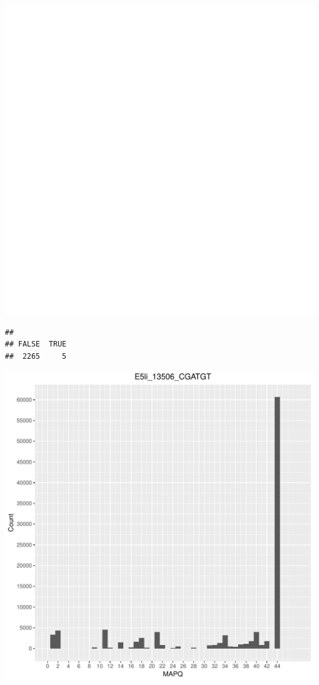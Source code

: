 \documentclass[12pt, a4paper]{article}\usepackage[]{graphicx}\usepackage[]{color}
\makeatletter
\def\maxwidth{ %
  \ifdim\Gin@nat@width>\linewidth
    \linewidth
  \else
    \Gin@nat@width
  \fi
}
\newenvironment{kframe}{%
 \def\at@end@of@kframe{}%
 \ifinner\ifhmode%
  \def\at@end@of@kframe{\end{minipage}}%
  \begin{minipage}{\columnwidth}%
 \fi\fi%
 \def\FrameCommand##1{\hskip\@totalleftmargin \hskip-\fboxsep
 \colorbox{shadecolor}{##1}\hskip-\fboxsep
     \hskip-\linewidth \hskip-\@totalleftmargin \hskip\columnwidth}%
 \MakeFramed {\advance\hsize-\width
   \@totalleftmargin\z@ \linewidth\hsize
   \@setminipage}}%
 {\par\unskip\endMakeFramed%
 \at@end@of@kframe}
\newenvironment{knitrout}{}{} %
\makeatother
\begin{document}
\begin{knitrout}
\includegraphics[width=\maxwidth]{figure/unnamed-chunk-3-18} 
\begin{kframe}\begin{verbatim}
## 
## FALSE  TRUE 
##  2265     5
\end{verbatim}
\end{kframe}
\includegraphics[width=\maxwidth]{figure/unnamed-chunk-3-19} 


\end{knitrout}
\end{document}
